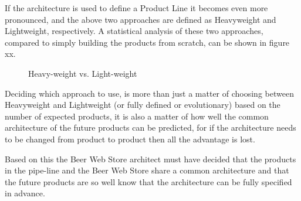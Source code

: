 If the architecture is used to define a Product Line it becomes even more pronounced, and the above two approaches are defined as Heavyweight and Lightweight, respectively. A statistical analysis of these two approaches, compared to simply building the products from scratch, can be shown in figure xx.

\clearpage

\begin{figure}[!htb]
\centerline{}
\caption{Heavy-weight vs. Light-weight}
\label{fig:product-line}
\end{figure}

Deciding which approach to use, is more than just a matter of choosing between Heavyweight and Lightweight (or fully defined or evolutionary) based on the number of expected products, it is also a matter of how well the common architecture of the future products can be predicted, for if the architecture needs to be changed from product to product then all the advantage is lost.

Based on this the Beer Web Store architect must have decided that the products in the pipe-line and the Beer Web Store share a common architecture and that the future products are so well know that the architecture can be fully specified in advance.
